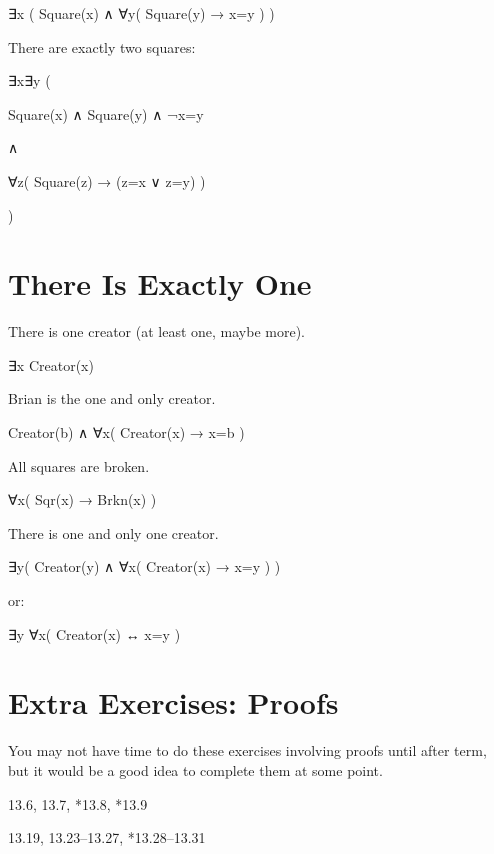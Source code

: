 \documentclass[12pt]{extarticle}
\begin{document}
\begin{multicols*}{3}
\hspace{5mm} ∃x ( Square(x) ∧ ∀y( Square(y) → x=y ) )
 
There are exactly two squares:
 
\hspace{5mm} ∃x∃y (
 
\hspace{10mm} Square(x) ∧ Square(y) ∧ ¬x=y
 
\hspace{10mm} ∧
 
\hspace{10mm} ∀z( Square(z) → (z=x ∨ z=y) )
 
\hspace{5mm} )
 
 
 
\section{There Is Exactly One}
 
There is one creator (at least one, maybe more).
 
\hspace{3mm} ∃x Creator(x)
 
Brian is the one and only creator.
 
\hspace{3mm} Creator(b) ∧ ∀x( Creator(x) → x=b )
 
All squares are broken.
 
\hspace{3mm} ∀x( Sqr(x) → Brkn(x) )
 
There is one and only one creator.
 
\hspace{3mm} ∃y( Creator(y) ∧ ∀x( Creator(x) → x=y ) )
 
\hspace{3mm} or:
 
\hspace{3mm} ∃y ∀x( Creator(x) ↔ x=y )
 
\section{Extra Exercises: Proofs}
 
You may not have time to do these exercises involving proofs until after term, but it would be a good idea to complete them at some point.
 
\hspace{5mm} 13.6, 13.7, *13.8, *13.9
 
\hspace{5mm} 13.19, 13.23--13.27, *13.28--13.31
 

\end{multicols*}
\end{document}
